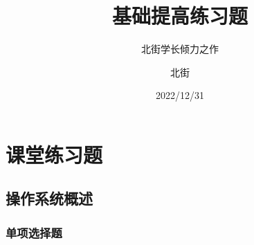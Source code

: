 \documentclass[lang=cn,newtx,10pt,scheme=chinese]{../../elegantbook}
\title{基础提高练习题}
\subtitle{北街学长倾力之作}
\author{北街}
\date{2022/12/31}
\begin{document}
\maketitle
\frontmatter

\tableofcontents

\mainmatter

\chapter{课堂练习题}
\section{操作系统概述}
\subsection{单项选择题}
\end{document}
